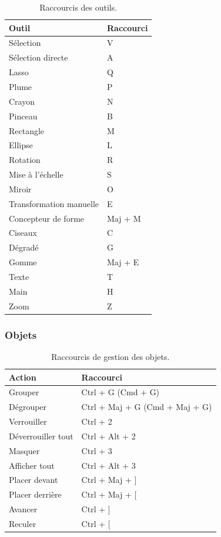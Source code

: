 \begin{table}[h!]
\centering
\begin{tabular}{@{}ll@{}}
\toprule
\textbf{Outil} & \textbf{Raccourci} \\
\midrule
Sélection & V \\
Sélection directe & A \\
Lasso & Q \\
Plume & P \\
Crayon & N \\
Pinceau & B \\
Rectangle & M \\
Ellipse & L \\
Rotation & R \\
Mise à l'échelle & S \\
Miroir & O \\
Transformation manuelle & E \\
Concepteur de forme & Maj + M \\
Ciseaux & C \\
Dégradé & G \\
Gomme & Maj + E \\
Texte & T \\
Main & H \\
Zoom & Z \\
\bottomrule
\end{tabular}
\caption{Raccourcis des outils.}
\end{table}

\subsubsection{Objets}

\begin{table}[h!]
\centering
\begin{tabular}{@{}ll@{}}
\toprule
\textbf{Action} & \textbf{Raccourci} \\
\midrule
Grouper & Ctrl + G (Cmd + G) \\
Dégrouper & Ctrl + Maj + G (Cmd + Maj + G) \\
Verrouiller & Ctrl + 2 \\
Déverrouiller tout & Ctrl + Alt + 2 \\
Masquer & Ctrl + 3 \\
Afficher tout & Ctrl + Alt + 3 \\
Placer devant & Ctrl + Maj + ] \\
Placer derrière & Ctrl + Maj + [ \\
Avancer & Ctrl + ] \\
Reculer & Ctrl + [ \\
\bottomrule
\end{tabular}
\caption{Raccourcis de gestion des objets.}
\end{table}

